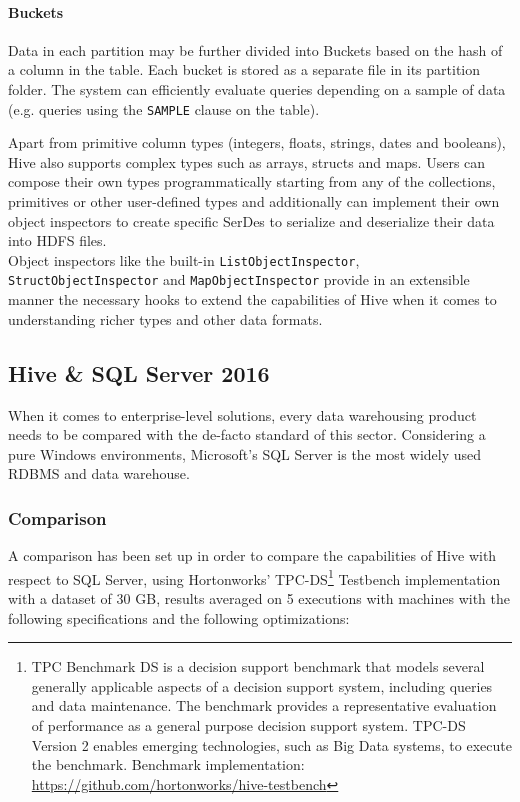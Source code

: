 \paragraph{Buckets} Data in each partition may be further divided into Buckets based on the hash of a column in the table. Each bucket is stored as a separate file in its partition folder. The system can efficiently evaluate queries depending on a sample of data (e.g. queries using the \texttt{SAMPLE} clause on the table).
\newline
\par
Apart from primitive column types (integers, floats, strings, dates and booleans), Hive also supports complex types such as arrays, structs and maps. Users can compose their own types programmatically starting from any of the collections, primitives or other user-defined types and additionally can implement their own object inspectors to create specific SerDes to serialize and deserialize their data into HDFS files.\\
Object inspectors like the built-in \texttt{ListObjectInspector}, \texttt{StructObjectInspector} and \texttt{MapObjectInspector} provide in an extensible manner the necessary hooks to extend the capabilities of Hive when it comes to understanding richer types and other data formats.

\subsection{Hive \& SQL Server 2016}

When it comes to enterprise-level solutions, every data warehousing product needs to be compared with the de-facto standard of this sector. Considering a pure Windows environments, Microsoft's SQL Server is the most widely used RDBMS and data warehouse.\newline

\subsubsection{Comparison}

A comparison has been set up in order to compare the capabilities of Hive with respect to SQL Server, using Hortonworks' TPC-DS\footnote{TPC Benchmark DS is a decision support benchmark that models several generally applicable aspects of a decision support system, including queries and data maintenance. The benchmark provides a representative evaluation of performance as a general purpose decision support system. TPC-DS Version 2 enables emerging technologies, such as Big Data systems, to execute the benchmark. Benchmark implementation: \href{https://github.com/hortonworks/hive-testbench}{https://github.com/hortonworks/hive-testbench}} Testbench implementation with a dataset of 30 GB, results averaged on 5 executions with machines with the following specifications and the following optimizations:
\newline

